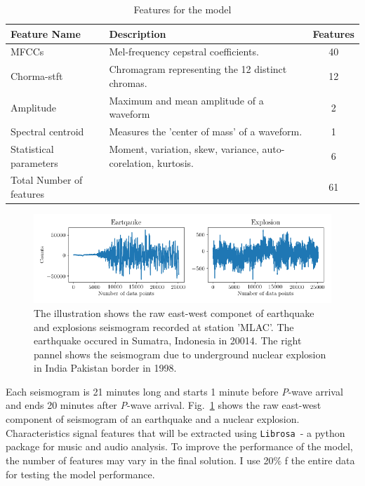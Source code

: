 \documentclass[12pt]{article}
\begin{document}
        \begin{table}[ht]
            \caption{Features for the model}
            \vspace{0.5em}
            \label{tab:feature_list}
            \begin{tabular}{l p{} c }
                \hline
                Feature Name & Description & Features \\
                \hline
                MFCCs & Mel-frequency cepstral coefficients. & 40\\
                Chorma-stft & Chromagram representing the 12 distinct chromas. & 12 \\
                Amplitude & Maximum and mean amplitude of a waveform & 2\\
                Spectral centroid & Measures the 'center of mass' of a waveform. & 1\\
                Statistical parameters & Moment, variation, skew, variance, auto-corelation, kurtosis. & 6 \\
                \hline
                Total Number of features & & 61 \\
                \hline
            \end{tabular}
        \end{table}
    
    
        \begin{figure}[!htb]
            \begin{center}
            \includegraphics[scale=0.6]{figures/raw_seismograms.png}
            \end{center}
            \caption{The illustration shows the raw east-west componet of earthquake and explosions seismogram recorded at station 'MLAC'.  The earthquake occured in Sumatra, Indonesia in 20014.  The right pannel shows the seismogram due to underground nuclear explosion in India Pakistan border in 1998.}
            \label{fig:raw_seismograms}
        \end{figure}
    
        Each seismogram is 21 minutes long and starts 1 minute before \textit{P}-wave arrival and ends 20 minutes after \textit{P}-wave arrival. Fig.~\ref{fig:raw_seismograms} shows the raw east-west component of seismogram of an earthquake and a nuclear explosion. Characteristics signal features that will be extracted using \texttt{Librosa}~\citep{mcfee2015librosa}- a python package for music and audio analysis. To improve the performance of the model, the number of features may vary in the final solution. I use 20$\%$ f the entire data for testing the model performance.
        
\end{document}
